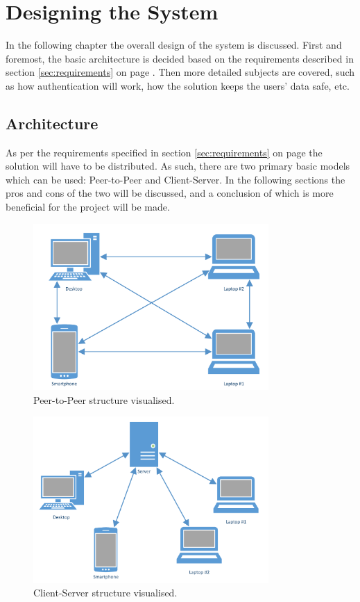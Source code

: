 \chapter{Designing the System}
	\label{chap:design}
	In the following chapter the overall design of the system is discussed. First and foremost, the basic architecture is decided based on the requirements described in section \ref{sec:requirements} on page \pageref{sec:requirements}. Then more detailed subjects are covered, such as how authentication will work, how the solution keeps the users' data safe, etc.

	\section{Architecture}
		\label{sec:arch}
		As per the requirements specified in section \ref{sec:requirements} on page \pageref{sec:requirements} the solution will have to be distributed. As such, there are two primary basic models which can be used: Peer-to-Peer and Client-Server. In the following sections the pros and cons of the two will be discussed, and a conclusion of which is more beneficial for the project will be made.

		\begin{figure}[p]
			\centering
			\includegraphics[width=0.8\textwidth]{figures/design/PeerToPeer.pdf}
			\caption{Peer-to-Peer structure visualised.}
			\label{fig:peertopeer}
		\end{figure}

		\begin{figure}[p]
			\centering
			\includegraphics[width=0.8\textwidth]{figures/design/ClientServer.pdf}
			\caption{Client-Server structure visualised.}
			\label{fig:clientserver}
		\end{figure}


